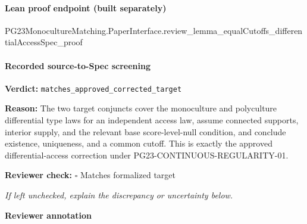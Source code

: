 \documentclass[10pt]{article}
\newcommand{\reviewerbox}{%
  \par\noindent\fbox{\parbox{0.96\linewidth}{\rule{0pt}{0.38in}}}\par
}
\newcommand{\reviewmatch}[1]{%
  \par\noindent\textbf{Reviewer check:} $\square$\; #1\par
  \noindent\emph{If left unchecked, explain the discrepancy or uncertainty below.}\par
}
\begin{document}
\paragraph{Lean proof endpoint (built separately)}\begin{ReviewVerbatim}
PG23MonocultureMatching.PaperInterface.review_lemma_equalCutoffs_differentialAccessSpec_proof
\end{ReviewVerbatim}

\paragraph{Recorded source-to-Spec screening}
\textbf{Verdict:} \texttt{matches\_approved\_corrected\_target}
\\
{\raggedright
\textbf{Reason:} The two target conjuncts cover the monoculture and polyculture differential type laws for an independent access law, assume connected supports, interior supply, and the relevant base score-\allowbreak{}level-\allowbreak{}null condition, and conclude existence, uniqueness, and a common cutoff.\allowbreak{} This is exactly the approved differential-\allowbreak{}access correction under PG23-\allowbreak{}CONTINUOUS-\allowbreak{}REGULARITY-\allowbreak{}01.\allowbreak{}
\par}
\reviewmatch{Matches formalized target}
\noindent\textbf{Reviewer annotation}\par
\reviewerbox
\end{document}
